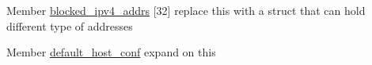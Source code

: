 
\begin{DoxyRefList}
\item[Member \mbox{\hyperlink{globals_8h_a7001c396444c2a4e6980701215de1ac8}{blocked\+\_\+ipv4\+\_\+addrs}} \mbox{[}32\mbox{]}]\label{todo__todo000002}%
%
replace this with a struct that can hold different type of addresses  
\item[Member \mbox{\hyperlink{globals_8h_a9c8e4f58df4b69f907e43970f83c287d}{default\+\_\+host\+\_\+conf}} ]\label{todo__todo000001}%
%
expand on this 
\end{DoxyRefList}